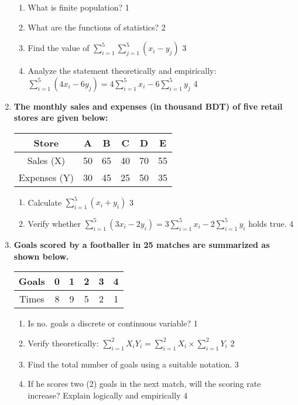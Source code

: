 \documentclass[a4paper,oneside]{book}
\begin{document}
\begin{enumerate}
  \begin{enumerate}
    \item
	What is finite population? \hfill 1
    \item
	What are the functions of statistics? \hfill 2
    \item  
	Find the value of $\displaystyle \sum_{i=1}^5 \sum_{j=1}^5 (x_i - y_j)$ \hfill 3
    \item
	Analyze the statement theoretically and empirically:  $\displaystyle \sum_{i=1}^5 (4x_i-6y_j) = 4 \sum_{i=1}^5 x_i - 6 \sum_{i=1}^5 y_j $ \hfill 4
  \end{enumerate}
  
  \item
\textbf{The monthly sales and expenses (in thousand BDT) of five retail stores are given below:}

\begin{table}[h]
\centering
\begin{tabular}{c|ccccc}
Store & A & B & C & D & E \\ \hline
Sales (X) & 50 & 65 & 40 & 70 & 55 \\ \hline
Expenses (Y) & 30 & 45 & 25 & 50 & 35
\end{tabular}
\end{table}

\begin{enumerate}
    \item 
    Calculate $\displaystyle \sum_{i=1}^5 (x_i + y_i)$ \hfill 3
    \item 
    Verify whether $\displaystyle \sum_{i=1}^5 (3x_i - 2y_i) = 3 \sum_{i=1}^5 x_i - 2 \sum_{i=1}^5 y_i$ holds true. \hfill 4
\end{enumerate}


\item
	  \textbf{Goals scored by a footballer in 25 matches are summarized as shown below.} 
	  
	  \begin{table}[h]
	  \centering
\begin{tabular}{|c|ccccc|}
Goals & 0 & 1 & 2 & 3 & 4 \\ \hline
Times & 8 & 9 & 5 & 2 & 1
\end{tabular}
\end{table}
  
  \begin{enumerate}
    \item
	Is no. goals a discrete or continuous variable? \hfill 1
    \item
	Verify theoretically: $\displaystyle \sum_{i=1}^{2} X_iY_i = \sum_{i=1}^{2} X_i \times \sum_{i=1}^{2} Y_i$ \hfill 2
    \item  
	Find the total number of goals using a suitable notation. \hfill 3
    \item
	If he scores two (2) goals in the next match, will the scoring rate increase? Explain logically and empirically \hfill 4
  \end{enumerate}
  

\end{enumerate}
\end{document}
